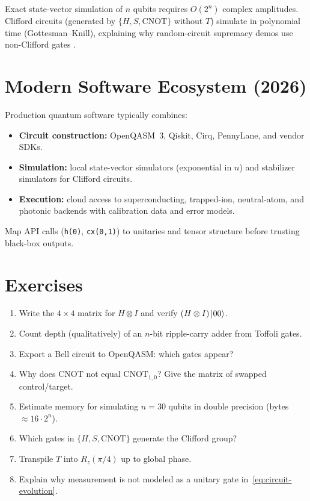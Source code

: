 Exact state-vector simulation of $n$ qubits requires $O(2^n)$ complex amplitudes. Clifford circuits (generated by $\{H,S,\mathrm{CNOT}\}$ without $T$) simulate in polynomial time (Gottesman--Knill), explaining why random-circuit supremacy demos use non-Clifford gates \cite{arute2019}.

\section{Modern Software Ecosystem (2026)}
\label{sec:software}

Production quantum software typically combines:
\begin{itemize}[noitemsep]
\item \textbf{Circuit construction:} OpenQASM~3, Qiskit, Cirq, PennyLane, and vendor SDKs.
\item \textbf{Simulation:} local state-vector simulators (exponential in $n$) and stabilizer simulators for Clifford circuits.
\item \textbf{Execution:} cloud access to superconducting, trapped-ion, neutral-atom, and photonic backends with calibration data and error models.
\end{itemize}

Map API calls (\texttt{h(0)}, \texttt{cx(0,1)}) to unitaries and tensor structure before trusting black-box outputs.

\section*{Exercises}
\begin{enumerate}[label=\arabic*.]
\item Write the $4\times 4$ matrix for $H\otimes I$ and verify $ (H\otimes I)\ket{00}$.
\item Count depth (qualitatively) of an $n$-bit ripple-carry adder from Toffoli gates.
\item Export a Bell circuit to OpenQASM: which gates appear?
\item Why does CNOT not equal $\mathrm{CNOT}_{1,0}$? Give the matrix of swapped control/target.
\item Estimate memory for simulating $n=30$ qubits in double precision (bytes $\approx 16\cdot 2^n$).
\item Which gates in $\{H,S,\mathrm{CNOT}\}$ generate the Clifford group?
\item Transpile $T$ into $R_z(\pi/4)$ up to global phase.
\item Explain why measurement is not modeled as a unitary gate in~\eqref{eq:circuit-evolution}.
\end{enumerate}
